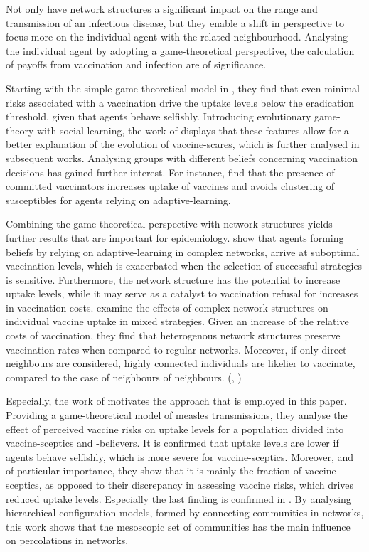 \documentclass[11pt]{article}
\begin{document}
Not only have network structures a significant impact on the range and transmission of an infectious disease, but they enable a shift in perspective to focus more on the individual agent with the related neighbourhood. 
Analysing the individual agent by adopting a game-theoretical perspective, the calculation of payoffs from vaccination and infection are of significance. 

Starting with the simple game-theoretical model in \cite{bauch2004}, they find that even minimal risks associated with a vaccination drive the uptake levels below the eradication threshold, given that agents behave selfishly. 
Introducing evolutionary game-theory with social learning, the work of \cite{bauch2012} displays that these features allow for a better explanation of the evolution of vaccine-scares, which is further analysed in subsequent works.
Analysing groups with different beliefs concerning vaccination decisions has gained further interest. For instance, \cite{liu2012} find that the presence of committed vaccinators increases uptake of vaccines and avoids clustering of susceptibles for agents relying on adaptive-learning.  

Combining the game-theoretical perspective with network structures yields further results that are important for epidemiology.   
\cite{fu2010} show that agents forming beliefs by relying on adaptive-learning in complex networks, arrive at suboptimal vaccination levels, which is exacerbated when the selection of successful strategies is sensitive. Furthermore, the network structure has the potential to increase uptake levels, while it may serve as a catalyst to vaccination refusal for increases in vaccination costs. \cite{shi2017} examine the effects of complex network structures on individual vaccine uptake in mixed strategies. Given an increase of the relative costs of vaccination, they find that heterogenous network structures preserve vaccination rates when compared to regular networks. Moreover, if only direct neighbours are considered, highly connected individuals are likelier to vaccinate, compared to the case of neighbours of neighbours. (\citeauthor{shi2017}, \citeyear{shi2017})

Especially, the work of \cite{shim2012} motivates the approach that is employed in this paper. Providing a game-theoretical model of measles transmissions, they analyse the effect of perceived vaccine risks on uptake levels for a population divided into vaccine-sceptics and -believers. It is confirmed that uptake levels are lower if agents behave selfishly, which is more severe for vaccine-sceptics. Moreover, and of particular importance, they show that it is mainly the fraction of vaccine-sceptics, as opposed to their discrepancy in assessing vaccine risks, which drives reduced uptake levels. 
Especially the last finding is confirmed in \cite{Stegehuis2016}. By analysing hierarchical configuration models, formed by connecting communities in networks, this work shows that the mesoscopic set of communities has the main influence on percolations in networks. 
\end{document}
